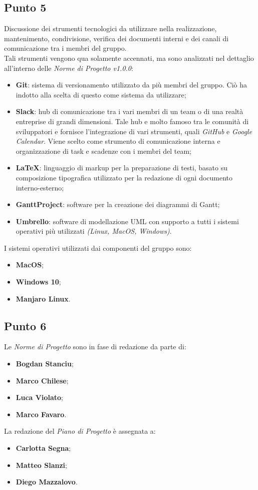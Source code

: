 \subsection{Punto 5}
Discussione dei strumenti tecnologici da utilizzare nella realizzazione, mantenimento, condivisione, verifica dei documenti interni e dei canali di comunicazione tra i membri del gruppo. \\
Tali strumenti vengono qua solamente accennati, ma sono analizzati nel dettaglio  all'interno delle \textit{Norme di Progetto v1.0.0}:
\begin{itemize}
	\item \textbf{Git}: sistema di versionamento utilizzato da più membri del gruppo. Ciò ha indotto alla scelta di questo come sistema da utilizzare; 
	\item \textbf{Slack}: hub di comunicazione tra i vari membri di un team o di una realtà entreprise di grandi dimensioni. Tale hub e molto famoso tra le comunità di sviluppatori e fornisce l'integrazione di vari strumenti, quali  				\textit{GitHub} e \textit{Google Calendar}. Viene scelto come strumento di comunicazione interna e organizzazione di task e scadenze con i membri del team; 
	\item \textbf{LaTeX}: linguaggio di markup per la preparazione di testi, basato su  composizione tipografica utilizzato per la redazione di ogni documento interno-esterno; 
	\item \textbf{GanttProject}: software per la creazione dei diagrammi di Gantt;
	\item \textbf{Umbrello}: software di modellazione UML con supporto a tutti i sistemi operativi più utilizzati \textit{(Linux, MacOS, Windows)}.
\end{itemize}

I sistemi operativi utilizzati dai componenti del gruppo sono:
\begin{itemize}
	\item \textbf{MacOS};
	\item \textbf{Windows 10};
	\item \textbf{Manjaro Linux}.
\end{itemize}

\subsection{Punto 6}
Le \textit{Norme di Progetto} sono in fase di redazione da parte di: 
\begin{itemize}
	\item \textbf{Bogdan Stanciu};
	\item \textbf{Marco Chilese};
	\item \textbf{Luca Violato};
	\item \textbf{Marco Favaro}.
\end{itemize} 

La redazione del \textit{Piano di Progetto} è assegnata a:
\begin{itemize}
	\item \textbf{Carlotta Segna};
	\item \textbf{Matteo Slanzi};
	\item \textbf{Diego Mazzalovo}.
\end{itemize}

